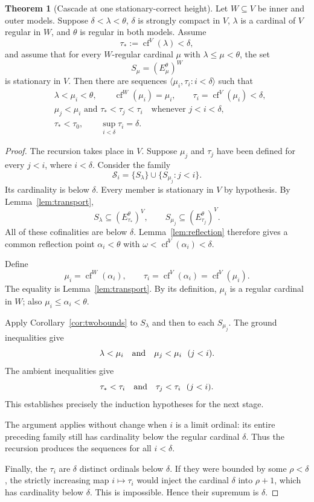 \documentclass[11pt,letterpaper]{article}
\theoremstyle{definition}
\newtheorem{theorem}[definition]{Theorem}
\numberwithin{equation}{section}
\newcommand{\cf}{\operatorname{cf}}
\begin{document}
\begin{theorem}[Cascade at one stationary-correct height]\label{thm:local}
Let $W\subseteq V$ be inner and outer models. Suppose $\delta<\lambda<\theta$, $\delta$ is strongly compact in $V$, $\lambda$ is a cardinal of $V$ regular in $W$, and $\theta$ is regular in both models. Assume
\[
\tau_*:=\cf^V(\lambda)<\delta,
\]
and assume that for every $W$-regular cardinal $\mu$ with $\lambda\le\mu<\theta$, the set
\[
S_\mu=(E^\theta_\mu)^W
\]
is stationary in $V$. Then there are sequences $\langle\mu_i,\tau_i:i<\delta\rangle$ such that
\begin{align*}
&\lambda<\mu_i<\theta,\qquad \cf^W(\mu_i)=\mu_i,\qquad
\tau_i=\cf^V(\mu_i)<\delta,\\
&\mu_j<\mu_i\text{ and }\tau_*<\tau_j<\tau_i
\quad\text{whenever }j<i<\delta,\\
&\tau_*<\tau_0,\qquad \sup_{i<\delta}\tau_i=\delta.
\end{align*}
\end{theorem}
\begin{proof}
The recursion takes place in $V$. Suppose $\mu_j$ and $\tau_j$ have been defined for every $j<i$, where $i<\delta$. Consider the family
\[
\mathcal S_i=\{S_\lambda\}\cup\{S_{\mu_j}:j<i\}.
\]
Its cardinality is below $\delta$. Every member is stationary in $V$ by hypothesis. By Lemma~\ref{lem:transport},
\[
S_\lambda\subseteq(E^\theta_{\tau_*})^V,
\qquad
S_{\mu_j}\subseteq(E^\theta_{\tau_j})^V.
\]
All of these cofinalities are below $\delta$. Lemma~\ref{lem:reflection} therefore gives a common reflection point $\alpha_i<\theta$ with
$\omega<\cf^V(\alpha_i)<\delta$.

Define
\begin{equation}\label{eq:recursive}
\mu_i=\cf^W(\alpha_i),\qquad
\tau_i=\cf^V(\alpha_i)=\cf^V(\mu_i).
\end{equation}
The equality is Lemma~\ref{lem:transport}. By its definition, $\mu_i$ is a regular cardinal in $W$; also $\mu_i\le\alpha_i<\theta$.

Apply Corollary~\ref{cor:twobounds} to $S_\lambda$ and then to each $S_{\mu_j}$. The ground inequalities give
\[
\lambda<\mu_i\quad\hbox{and}\quad\mu_j<\mu_i\ \ (j<i).
\]
The ambient inequalities give
\[
\tau_*<\tau_i\quad\hbox{and}\quad\tau_j<\tau_i\ \ (j<i).
\]
This establishes precisely the induction hypotheses for the next stage.

The argument applies without change when $i$ is a limit ordinal: its entire preceding family still has cardinality below the regular cardinal $\delta$. Thus the recursion produces the sequences for all $i<\delta$.

Finally, the $\tau_i$ are $\delta$ distinct ordinals below $\delta$. If they were bounded by some $\rho<\delta$, the strictly increasing map $i\mapsto\tau_i$ would inject the cardinal $\delta$ into $\rho+1$, which has cardinality below $\delta$. This is impossible. Hence their supremum is $\delta$.
\end{proof}
\end{document}
